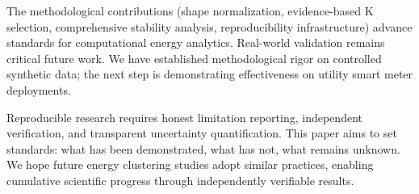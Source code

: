 The methodological contributions (shape normalization, evidence-based K selection, comprehensive stability analysis, reproducibility infrastructure) advance standards for computational energy analytics. Real-world validation remains critical future work. We have established methodological rigor on controlled synthetic data; the next step is demonstrating effectiveness on utility smart meter deployments.

Reproducible research requires honest limitation reporting, independent verification, and transparent uncertainty quantification. This paper aims to set standards: what has been demonstrated, what has not, what remains unknown. We hope future energy clustering studies adopt similar practices, enabling cumulative scientific progress through independently verifiable results.
